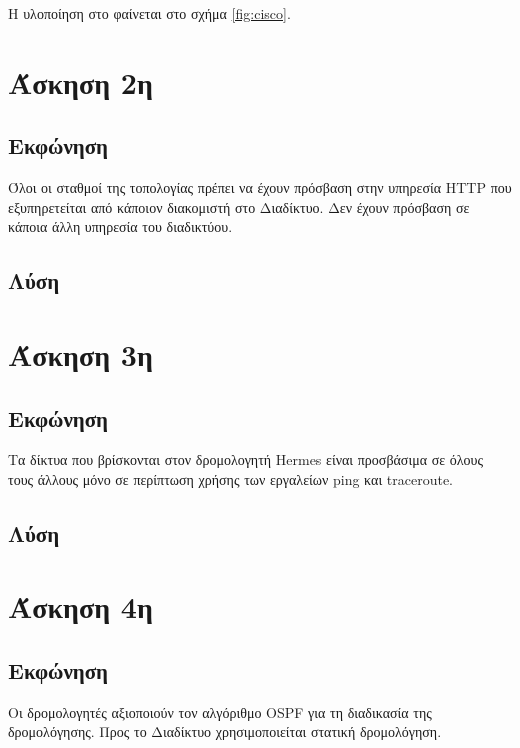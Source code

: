 \documentclass{assignment}
\begin{document}
Η υλοποίηση στο  φαίνεται στο σχήμα \ref{fig:cisco}.



\section{Άσκηση 2η}
\subsection{Εκφώνηση}

Όλοι οι σταθμοί της τοπολογίας πρέπει να έχουν πρόσβαση στην υπηρεσία HTTP που εξυπηρετείται από κάποιον διακομιστή στο Διαδίκτυο. Δεν έχουν πρόσβαση σε κάποια άλλη υπηρεσία του διαδικτύου.

\subsection{Λύση}


\section{Άσκηση 3η}
\subsection{Εκφώνηση}

Τα δίκτυα που βρίσκονται στον δρομολογητή Hermes είναι προσβάσιμα σε όλους τους άλλους μόνο σε περίπτωση χρήσης των εργαλείων ping και traceroute.

\subsection{Λύση}

\section{Άσκηση 4η}
\subsection{Εκφώνηση}

Οι δρομολογητές αξιοποιούν τον αλγόριθμο OSPF για τη διαδικασία της δρομολόγησης. 
Προς το Διαδίκτυο χρησιμοποιείται στατική δρομολόγηση.
\end{document}

